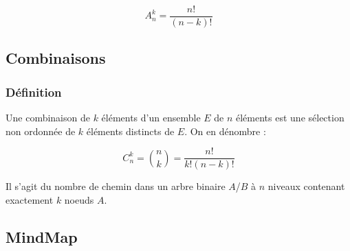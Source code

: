 \documentclass{report}
\begin{document}
\[ A_n^k = \frac{n!}{(n-k)!} \]

\subsection{Combinaisons}

\subsubsection{Définition}
Une combinaison de \( k \) éléments d'un ensemble \( E \) de \( n \) éléments est une sélection non ordonnée de \( k \) éléments distincts de \( E \). On en dénombre : 

\[ C_n^k = \binom{n}{k} = \frac{n!}{k!(n-k)!} \]

Il s'agit du nombre de chemin dans un arbre binaire $A$/$B$ à $n$ niveaux contenant exactement $k$ noeuds $A$.

\iffalse\subsubsection{Exemple}
Combien de mains de 5 cartes peut-on tirer d'un jeu de 32 cartes ?

\[ C_{32}^5 = \binom{32}{5} = \frac{32!}{5!(32-5)!} = 201376 \]
\fi

\iffalse\subsubsection{Exemple}
Développer \( (x + y)^3 \) :

\[ (x + y)^3 = \binom{3}{0} x^3 y^0 + \binom{3}{1} x^2 y^1 + \binom{3}{2} x^1 y^2 + \binom{3}{3} x^0 y^3 \]
\[ = x^3 + 3x^2y + 3xy^2 + y^3 \]\fi

\subsection{MindMap}
\end{document}
